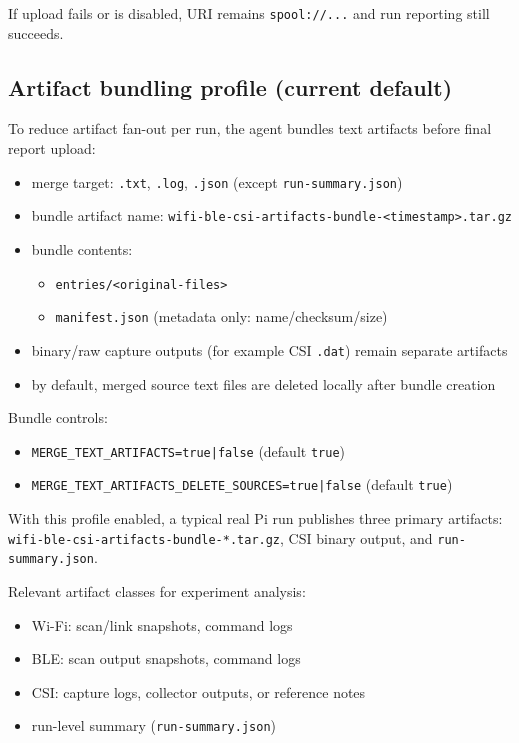 \documentclass[11pt,a4paper]{article}
\begin{document}
If upload fails or is disabled, URI remains \texttt{spool://...} and run reporting still succeeds.

\subsection{Artifact bundling profile (current default)}
To reduce artifact fan-out per run, the agent bundles text artifacts before final report upload:
\begin{itemize}
  \item merge target: \texttt{.txt}, \texttt{.log}, \texttt{.json} (except \texttt{run-summary.json})
  \item bundle artifact name: \texttt{wifi-ble-csi-artifacts-bundle-<timestamp>.tar.gz}
  \item bundle contents:
    \begin{itemize}
      \item \texttt{entries/<original-files>}
      \item \texttt{manifest.json} (metadata only: name/checksum/size)
    \end{itemize}
  \item binary/raw capture outputs (for example CSI \texttt{.dat}) remain separate artifacts
  \item by default, merged source text files are deleted locally after bundle creation
\end{itemize}

Bundle controls:
\begin{itemize}
  \item \texttt{MERGE\_TEXT\_ARTIFACTS=true|false} (default \texttt{true})
  \item \texttt{MERGE\_TEXT\_ARTIFACTS\_DELETE\_SOURCES=true|false} (default \texttt{true})
\end{itemize}

With this profile enabled, a typical real Pi run publishes three primary artifacts:
\texttt{wifi-ble-csi-artifacts-bundle-*.tar.gz}, CSI binary output, and \texttt{run-summary.json}.

Relevant artifact classes for experiment analysis:
\begin{itemize}
  \item Wi-Fi: scan/link snapshots, command logs
  \item BLE: scan output snapshots, command logs
  \item CSI: capture logs, collector outputs, or reference notes
  \item run-level summary (\texttt{run-summary.json})
\end{itemize}
\end{document}
